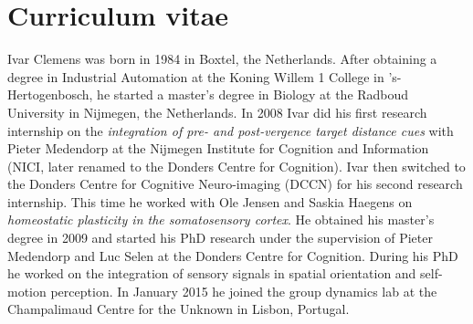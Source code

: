 \clearpage

\chapter*{Curriculum vitae}
{}

Ivar Clemens was born in 1984 in Boxtel, the Netherlands. After obtaining a degree in Industrial Automation at the Koning Willem 1 College in 's-Hertogenbosch, he started a master's degree in Biology at the Radboud University in Nijmegen, the Netherlands. In 2008 Ivar did his first research internship on the \emph{integration of pre- and post-vergence target distance cues} with Pieter Medendorp at the Nijmegen Institute for Cognition and Information (NICI, later renamed to the Donders Centre for Cognition). Ivar then switched to the Donders Centre for Cognitive Neuro-imaging (DCCN) for his second research internship. This time he worked with  Ole Jensen and Saskia Haegens on \emph{homeostatic plasticity in the somatosensory cortex}. He obtained his master's degree in 2009 and started his PhD research under the supervision of Pieter Medendorp and Luc Selen at the Donders Centre for Cognition. During his PhD he worked on the integration of sensory signals in spatial orientation and self-motion perception. In January 2015 he joined the group dynamics lab at the Champalimaud Centre for the Unknown in Lisbon, Portugal.
